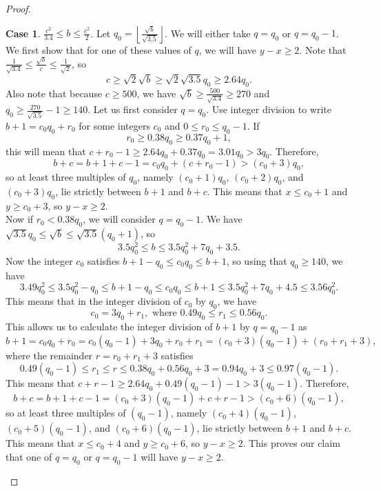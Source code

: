 \documentclass[12pt]{amsart}  %
\theoremstyle{definition}
\newtheorem{case}{Case}
\theoremstyle{remark}
\numberwithin{equation}{section}
\begin{document}
\begin{proof}
\begin{case}$\frac{c^2}{3.4}\leq b\leq\frac{c^2}2$. Let $q_0=\left\lfloor\frac{\sqrt b}{\sqrt{3.5}}\right\rfloor$. We will either take $q=q_0$ or $q=q_0-1$. We first show that for one of these values of $q$, we will have $y-x\geq 2$. Note that $\frac 1{\sqrt{3.4}}\leq\frac{\sqrt b}c\leq\frac 1{\sqrt 2}$, so
\begin{equation*}
c\geq\sqrt 2\sqrt b\geq\sqrt 2\sqrt{3.5}q_0\geq 2.64q_0.
\end{equation*} Also note that because $c\geq 500$, we have $\sqrt b\geq\frac{500}{\sqrt{3.4}}\geq 270$ and $q_0\geq\frac{270}{\sqrt{3.5}}-1\geq 140$. Let us first consider $q=q_0$. Use integer division to write $b+1=c_0q_0+r_0$ for some integers $c_0$ and $0\leq r_0\leq q_0-1$. If 
\begin{equation*}r_0\geq 0.38q_0\geq 0.37q_0+1,\end{equation*}
this will mean that $c+r_0-1\geq 2.64q_0+0.37q_0=3.01q_0>3q_0$. Therefore,
\begin{equation*}
b+c=b+1+c-1=c_0q_0+(c+r_0-1)>(c_0+3)q_0,
\end{equation*}
so at least three multiples of $q_0$, namely $(c_0+1)q_0$, $(c_0+2)q_0$, and $(c_0+3)q_0$, lie strictly between $b+1$ and $b+c$. This means that $x\leq c_0+1$ and $y\geq c_0+3$, so $y-x\geq 2$.\\

Now if $r_0<0.38q_0$, we will consider $q=q_0-1$. We have $\sqrt{3.5}q_0\leq\sqrt b\leq\sqrt{3.5}(q_0+1)$, so
\begin{equation*}
3.5q_0^2\leq b\leq 3.5q_0^2+7q_0+3.5.
\end{equation*}
Now the integer $c_0$ satisfies $b+1-q_0\leq c_0q_0\leq b+1$, so using that $q_0\geq 140$, we have
\begin{equation*}
3.49q_0^2\leq 3.5q_0^2-q_0\leq b+1-q_0\leq c_0q_0\leq b+1\leq 3.5q_0^2+7q_0+4.5\leq 3.56q_0^2.
\end{equation*}
This means that in the integer division of $c_0$ by $q_0$, we have
\begin{equation*}
c_0=3q_0+r_1,\text{ where }0.49q_0\leq r_1\leq 0.56q_0.
\end{equation*}
This allows us to calculate the integer division of $b+1$ by $q=q_0-1$ as
\begin{equation*}
b+1=c_0q_0+r_0=c_0(q_0-1)+3q_0+r_0+r_1=(c_0+3)(q_0-1)+(r_0+r_1+3),
\end{equation*}
where the remainder $r=r_0+r_1+3$ satisfies
\begin{equation*}
0.49(q_0-1)\leq r_1\leq r\leq 0.38q_0+0.56q_0+3=0.94q_0+3\leq 0.97(q_0-1).
\end{equation*}
This means that $c+r-1\geq 2.64q_0+0.49(q_0-1)-1>3(q_0-1)$. Therefore,
\begin{equation*}
b+c=b+1+c-1=(c_0+3)(q_0-1)+c+r-1>(c_0+6)(q_0-1),
\end{equation*}
so at least three multiples of $(q_0-1)$, namely $(c_0+4)(q_0-1)$, $(c_0+5)(q_0-1)$, and $(c_0+6)(q_0-1)$, lie strictly between $b+1$ and $b+c$. This means that $x\leq c_0+4$ and $y\geq c_0+6$, so $y-x\geq 2$. This proves our claim that one of $q=q_0$ or $q=q_0-1$ will have $y-x\geq 2$.\\


\end{case}
\end{proof}
\end{document}
